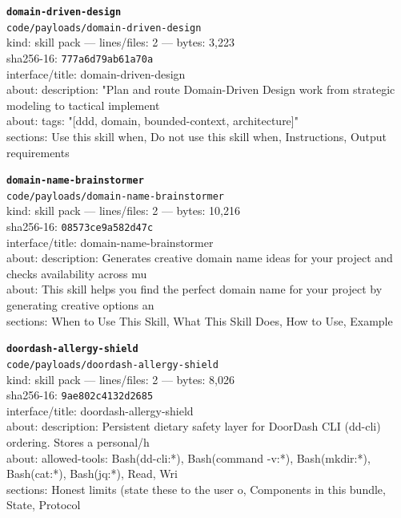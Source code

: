 \noindent\textbf{\texttt{domain-driven-design}}\\
\texttt{code/payloads/domain-driven-design}\\
kind: skill pack --- lines/files: 2 --- bytes: 3,223\\
sha256-16: \texttt{777a6d79ab61a70a}\\
interface/title: domain-driven-design\\
about: description: "Plan and route Domain-Driven Design work from strategic modeling to tactical implement\\
about: tags: "[ddd, domain, bounded-context, architecture]"\\
sections: Use this skill when, Do not use this skill when, Instructions, Output requirements\\
\vspace*{6.0pt}

\noindent\textbf{\texttt{domain-name-brainstormer}}\\
\texttt{code/payloads/domain-name-brainstormer}\\
kind: skill pack --- lines/files: 2 --- bytes: 10,216\\
sha256-16: \texttt{08573ce9a582d47c}\\
interface/title: domain-name-brainstormer\\
about: description: Generates creative domain name ideas for your project and checks availability across mu\\
about: This skill helps you find the perfect domain name for your project by generating creative options an\\
sections: When to Use This Skill, What This Skill Does, How to Use, Example\\
\vspace*{6.0pt}
\newpage

\noindent\textbf{\texttt{doordash-allergy-shield}}\\
\texttt{code/payloads/doordash-allergy-shield}\\
kind: skill pack --- lines/files: 2 --- bytes: 8,026\\
sha256-16: \texttt{9ae802c4132d2685}\\
interface/title: doordash-allergy-shield\\
about: description: Persistent dietary safety layer for DoorDash CLI (dd-cli) ordering. Stores a personal/h\\
about: allowed-tools: Bash(dd-cli:*), Bash(command -v:*), Bash(mkdir:*), Bash(cat:*), Bash(jq:*), Read, Wri\\
sections: Honest limits (state these to the user o, Components in this bundle, State, Protocol\\
\vspace*{6.0pt}

